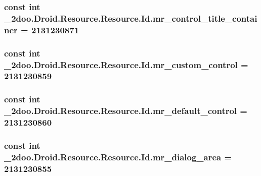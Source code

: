 \hypertarget{class__2doo_1_1_droid_1_1_resource_1_1_id_dd5bd5a477f98563ab24fd76b8903dd2}{
\subsubsection[{mr\_\-control\_\-title\_\-container}]{\setlength{\rightskip}{0pt plus 5cm}const int \_\-2doo.Droid.Resource.Resource.Id.mr\_\-control\_\-title\_\-container = 2131230871}}
\label{class__2doo_1_1_droid_1_1_resource_1_1_id_dd5bd5a477f98563ab24fd76b8903dd2}


\hypertarget{class__2doo_1_1_droid_1_1_resource_1_1_id_444e98c4ab3525c565d1dd3537a35fde}{
\subsubsection[{mr\_\-custom\_\-control}]{\setlength{\rightskip}{0pt plus 5cm}const int \_\-2doo.Droid.Resource.Resource.Id.mr\_\-custom\_\-control = 2131230859}}
\label{class__2doo_1_1_droid_1_1_resource_1_1_id_444e98c4ab3525c565d1dd3537a35fde}


\hypertarget{class__2doo_1_1_droid_1_1_resource_1_1_id_b5fefb7045e075e938daa63992a24d67}{
\subsubsection[{mr\_\-default\_\-control}]{\setlength{\rightskip}{0pt plus 5cm}const int \_\-2doo.Droid.Resource.Resource.Id.mr\_\-default\_\-control = 2131230860}}
\label{class__2doo_1_1_droid_1_1_resource_1_1_id_b5fefb7045e075e938daa63992a24d67}


\hypertarget{class__2doo_1_1_droid_1_1_resource_1_1_id_26b02d9ac73419bf3ca377f9313898ec}{
\subsubsection[{mr\_\-dialog\_\-area}]{\setlength{\rightskip}{0pt plus 5cm}const int \_\-2doo.Droid.Resource.Resource.Id.mr\_\-dialog\_\-area = 2131230855}}
\label{class__2doo_1_1_droid_1_1_resource_1_1_id_26b02d9ac73419bf3ca377f9313898ec}


